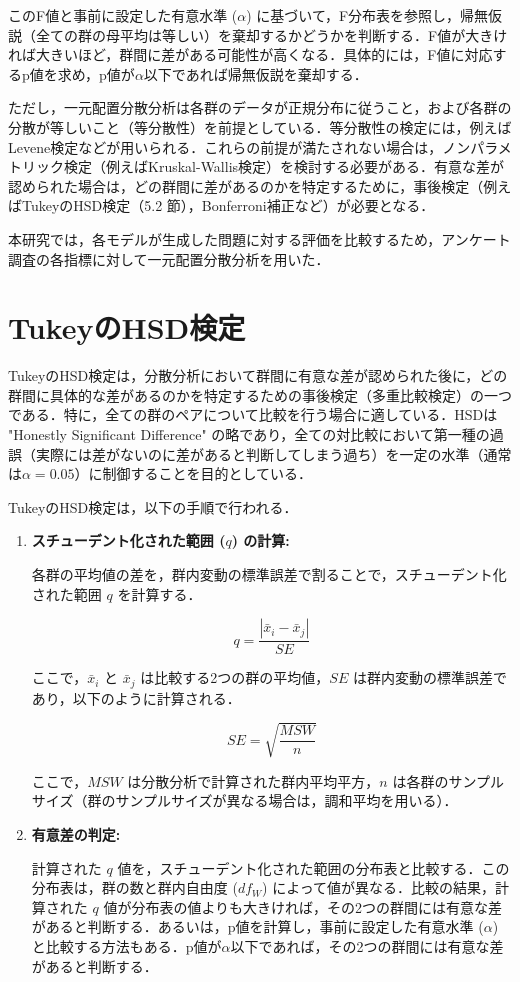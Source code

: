 \documentclass[11pt]{jreport}
\begin{document}
このF値と事前に設定した有意水準 ($\alpha$) に基づいて，F分布表を参照し，帰無仮説（全ての群の母平均は等しい）を棄却するかどうかを判断する．F値が大きければ大きいほど，群間に差がある可能性が高くなる．具体的には，F値に対応するp値を求め，p値が$\alpha$以下であれば帰無仮説を棄却する．

ただし，一元配置分散分析は各群のデータが正規分布に従うこと，および各群の分散が等しいこと（等分散性）を前提としている．等分散性の検定には，例えばLevene検定などが用いられる．これらの前提が満たされない場合は，ノンパラメトリック検定（例えばKruskal-Wallis検定）を検討する必要がある．有意な差が認められた場合は，どの群間に差があるのかを特定するために，事後検定（例えばTukeyのHSD検定（5.2
節），Bonferroni補正など）が必要となる．

本研究では，各モデルが生成した問題に対する評価を比較するため，アンケート調査の各指標に対して一元配置分散分析を用いた．

\section{TukeyのHSD検定}
TukeyのHSD検定は，分散分析において群間に有意な差が認められた後に，どの群間に具体的な差があるのかを特定するための事後検定（多重比較検定）の一つである．特に，全ての群のペアについて比較を行う場合に適している．HSDは "Honestly Significant Difference" の略であり，全ての対比較において第一種の過誤（実際には差がないのに差があると判断してしまう過ち）を一定の水準（通常は$\alpha = 0.05$）に制御することを目的としている．

TukeyのHSD検定は，以下の手順で行われる．

\begin{enumerate}
    \item \textbf{スチューデント化された範囲 ($q$) の計算:}

    各群の平均値の差を，群内変動の標準誤差で割ることで，スチューデント化された範囲 $q$ を計算する．

    \begin{equation}
    q = \frac{|\bar{x}_i - \bar{x}_j|}{SE}
    \end{equation}

    ここで，$\bar{x}_i$ と $\bar{x}_j$ は比較する2つの群の平均値，$SE$ は群内変動の標準誤差であり，以下のように計算される．

    \begin{equation}
    SE = \sqrt{\frac{MSW}{n}}
    \end{equation}

    ここで，$MSW$ は分散分析で計算された群内平均平方，$n$ は各群のサンプルサイズ（群のサンプルサイズが異なる場合は，調和平均を用いる）．

    \item \textbf{有意差の判定:}

    計算された $q$ 値を，スチューデント化された範囲の分布表と比較する．この分布表は，群の数と群内自由度 ($df_W$) によって値が異なる．比較の結果，計算された $q$ 値が分布表の値よりも大きければ，その2つの群間には有意な差があると判断する．あるいは，p値を計算し，事前に設定した有意水準 ($\alpha$) と比較する方法もある．p値が$\alpha$以下であれば，その2つの群間には有意な差があると判断する．
    
\end{enumerate}
\end{document}
